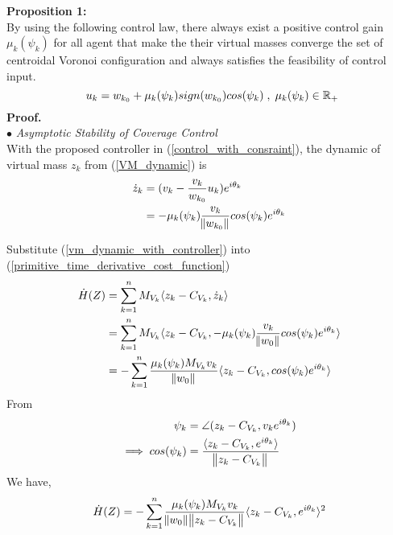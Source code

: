 \noindent \textbf{Proposition 1:} \\
\noindent By using the following control law, there always exist a positive control gain ${\mu_k(\psi_k)}$ for all agent that make the their virtual masses converge the set of centroidal Voronoi configuration and always satisfies the feasibility of control input.
\begin{equation} \label{control_with_consraint}
\txtspc{ } u_{k} = w_{k_0} + \mu_k(\psi_{k})sign(w_{k_0})cos(\psi_{k})\txtspc{,} \mu_k(\psi_{k}) \in \mathbb{R}_+ \\
\end{equation}
\noindent \textbf{Proof.} \\
$\bullet$ \textit{Asymptotic Stability of Coverage Control} \\
\noindent With the proposed controller in (\ref{control_with_consraint}), the dynamic of virtual mass ${z_k}$ from (\ref{VM_dynamic}) is\\
\begin{equation}  \label{vm_dynamic_with_controller}
\begin{split}
\dot z_{k} & =  (v_k - \frac{v_k}{w_{k_0}}u_k)e^{i\theta_{k}} \\
& = -\mu_k(\psi_{k})\frac{v_k}{\norm{w_{k_0}}} cos(\psi_{k})e^{i\theta_{k}} \\
\end{split}
\end{equation}

\noindent Substitute (\ref{vm_dynamic_with_controller}) into (\ref{primitive_time_derivative_cost_function})
\begin{equation}\notag
\begin{split}
\dot H(Z) & = \displaystyle\sum_{k=1}^{n} M_{V_{k}}\langle{z_{k} - C_{V_{k}},\dot z_k}\rangle \\
& = \displaystyle\sum_{k=1}^{n} M_{V_{k}}\langle{z_{k} - C_{V_{k}},-\mu_k(\psi_{k})\frac{v_k}{\norm{w_0}} cos(\psi_{k})e^{i\theta_{k}}}\rangle \\
& = - \displaystyle\sum_{k=1}^{n} \frac{\mu_k(\psi_{k})M_{V_{k}}v_{k}}{\norm{w_{0}}} \langle{z_{k} - C_{V_{k}},cos(\psi_{k})e^{i\theta_{k}} }\rangle \\
\end{split}
\end{equation}
\noindent From
\begin{equation} \notag
\begin{split}
\psi_{k} & = \angle (z_{k} - C_{V_{k}}, v_{k}e^{i\theta_{k}}) \\
\implies cos(\psi_{k}) & = \frac{\langle{z_{k} - C_{V_{k}}},{e^{i\theta_{k}}}\rangle}{\norm{z_{k} - C_{V_{k}}}} \\
\end{split}
\end{equation}
\noindent We have,
\begin{equation} \notag
\begin{split}
\dot H(Z) & = - \displaystyle\sum_{k=1}^{n} \frac{\mu_k(\psi_{k})M_{V_{k}}v_{k}}{\norm{w_{0}}\norm{z_{k} - C_{V_{k}}}} \langle{z_{k} - C_{V_{k}},e^{i\theta_{k}}}\rangle^{2} \\
\end{split}
\end{equation}

